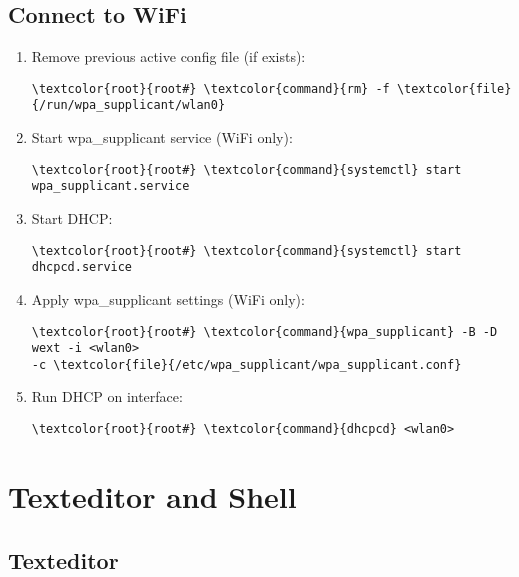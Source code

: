 \documentclass[10pt, a4paper, onecolumn, openany]{book} %
\begin{document}
\section{Connect to WiFi}
\begin{enumerate}
    \item Remove previous active config file (if exists):
\begin{Verbatim}[commandchars=\\\{\}]
\textcolor{root}{root#} \textcolor{command}{rm} -f \textcolor{file}{/run/wpa_supplicant/wlan0}
\end{Verbatim}
    \item Start wpa\_supplicant service (WiFi only):
\begin{Verbatim}[commandchars=\\\{\}]
\textcolor{root}{root#} \textcolor{command}{systemctl} start wpa_supplicant.service
\end{Verbatim}
    \item Start DHCP:
\begin{Verbatim}[commandchars=\\\{\}]
\textcolor{root}{root#} \textcolor{command}{systemctl} start dhcpcd.service
\end{Verbatim}
    \item Apply wpa\_supplicant settings (WiFi only):
\begin{Verbatim}[commandchars=\\\{\}]
\textcolor{root}{root#} \textcolor{command}{wpa_supplicant} -B -D wext -i <wlan0>
-c \textcolor{file}{/etc/wpa_supplicant/wpa_supplicant.conf}
\end{Verbatim}
    \item Run DHCP on interface:
\begin{Verbatim}[commandchars=\\\{\}]
\textcolor{root}{root#} \textcolor{command}{dhcpcd} <wlan0>
\end{Verbatim}
\end{enumerate}
\chapter{Texteditor and Shell}
\section{Texteditor}
\end{document}
